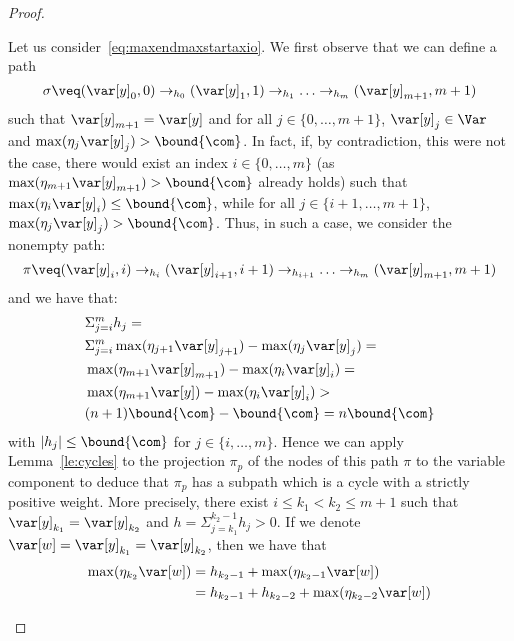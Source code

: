 \begin{proof}
\begin{inductive}
    Let us consider\ \eqref{eq:maxendmaxstartaxio}. We first observe that we
    can define a path
    \begin{equation}\label{eq:sigmapath}
      \sigma \veq (\var[y]_0, 0) \to_{h_0} (\var[y]_1, 1) \to_{h_1}
      \ldots \to_{h_m} (\var[y]_{m+1}, m+1)
    \end{equation}
    such that \(\var[y]_{m+1}=\var[y]\) and for all \(j \in \{0,\ldots, m+1\}\), 
    \(\var[y]_j\in \Var\)  and
    \(\max(\eta_{j} \var[y]_{j}) > \bound{\com}\).
    In fact, if, by contradiction, this were not the case, there would
    exist an index \(i \in \{0,\ldots, m\}\) (as
    \(\max(\eta_{m+1} \var[y]_{m+1}) > \bound{\com}\) already holds)
    such that \(\max(\eta_{i} \var[y]_{i}) \leq \bound{\com}\), while
    for all \(j \in \{i+1,\ldots, m+1\}\),
    \(\max(\eta_{j} \var[y]_j) > \bound{\com}\).  Thus, in such a case,
    we consider the nonempty path:
    \begin{equation}\label{eq:pi}
      \pi \veq (\var[y]_i, i) \to_{h_i} (\var[y]_{i+1}, i+1) \to_{h_{i+1}} \ldots \to_{h_m} (\var[y]_{m+1}, m+1)
    \end{equation}
    and we have that:
    \begin{align*}
      &\Sigma_{j=i}^m h_j =\\ 
      &\Sigma_{j=i}^m \max(\eta_{j+1} \var[y]_{j+1}) - \max(\eta_j \var[y]_{j}) =\\
      &\max(\eta_{m+1} \var[y]_{m+1}) - \max(\eta_i \var[y]_{i}) =\\
      &\max(\eta_{m+1} \var[y]) - \max(\eta_i \var[y]_{i})>\\
      &  (n+1) \bound{\com} - \bound{\com} = n \bound{\com}
    \end{align*}
    with \(|h_j| \leq \bound{\com}\) for \(j \in \{i,\ldots,
    m\}\). Hence we can apply Lemma~\ref{le:cycles} to the projection
    \(\pi_p\) of the nodes of this path \(\pi\) to the variable
    component to deduce that \(\pi_p\) has a subpath which is a cycle
    with a strictly positive weight.  More precisely, there exist
    \(i \leq k_1 < k_2 \leq m+1\) such that
    \(\var[y]_{k_1} = \var[y]_{k_2}\) and
    \(h = \Sigma_{j=k_1}^{k_2-1} h_j > 0\). If we denote
    \(\var[w] = \var[y]_{k_1} = \var[y]_{k_2}\), then we have that
    \begin{align*}
      \max(\eta_{k_2} \var[w]) & =  h_{k_2-1}  + \max(\eta_{k_2-1} \var[w]) \\
                               & =  h_{k_2-1} + h_{k_2-2} + \max(\eta_{k_2-2} \var[w])  \\

\end{align*}
\end{inductive}
\end{proof}
